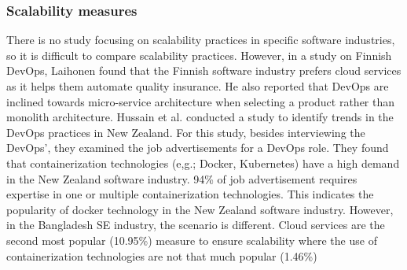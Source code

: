 \subsubsection{Scalability measures}
\label{scalability_comparison}
There is no study focusing on scalability practices in specific software industries, so it is difficult to compare scalability practices. However, in a study on Finnish DevOps, Laihonen\cite{Laihonen2018} found that the Finnish software industry prefers cloud services as it helps them automate quality insurance. He also reported that DevOps are inclined towards micro-service architecture when selecting a product rather than monolith architecture. Hussain et al.\cite{Hussain2017} conducted a study to identify trends in the DevOps practices in New Zealand. For this study, besides interviewing the DevOps', they examined the job advertisements for a DevOps role. They found that containerization technologies (e,g.; Docker, Kubernetes) have a high demand in the New Zealand software industry. 94\% of job advertisement requires expertise in one or multiple containerization technologies. This indicates the popularity of docker technology in the New Zealand software industry. However, in the Bangladesh SE industry, the scenario is different. Cloud services are the second most popular (10.95\%)  measure to ensure scalability where the use of containerization technologies are not that much popular (1.46\%)